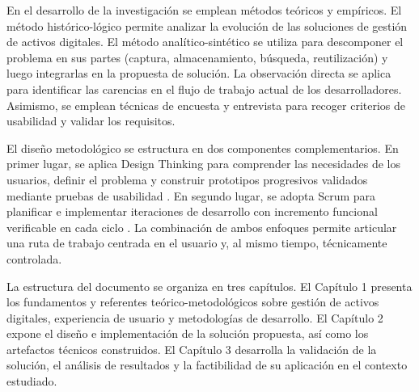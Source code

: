 En el desarrollo de la investigación se emplean métodos teóricos y empíricos. El método histórico-lógico permite analizar la evolución de las soluciones de gestión de activos digitales. El método analítico-sintético se utiliza para descomponer el problema en sus partes (captura, almacenamiento, búsqueda, reutilización) y luego integrarlas en la propuesta de solución. La observación directa se aplica para identificar las carencias en el flujo de trabajo actual de los desarrolladores. Asimismo, se emplean técnicas de encuesta y entrevista para recoger criterios de usabilidad y validar los requisitos.

El diseño metodológico se estructura en dos componentes complementarios. En primer lugar, se aplica Design Thinking para comprender las necesidades de los usuarios, definir el problema y construir prototipos progresivos validados mediante pruebas de usabilidad \citep{Brown2008,Nielsen2024}. En segundo lugar, se adopta Scrum para planificar e implementar iteraciones de desarrollo con incremento funcional verificable en cada ciclo \citep{SchwaberSutherland2020}. La combinación de ambos enfoques permite articular una ruta de trabajo centrada en el usuario y, al mismo tiempo, técnicamente controlada.

La estructura del documento se organiza en tres capítulos. El Capítulo 1 presenta los fundamentos y referentes teórico-metodológicos sobre gestión de activos digitales, experiencia de usuario y metodologías de desarrollo. El Capítulo 2 expone el diseño e implementación de la solución propuesta, así como los artefactos técnicos construidos. El Capítulo 3 desarrolla la validación de la solución, el análisis de resultados y la factibilidad de su aplicación en el contexto estudiado.
